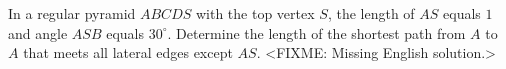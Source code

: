 \problem
In a regular pyramid $ABCDS$ with the top vertex $S$, the length of $AS$ equals
$1$ and angle $ASB$ equals $30^\circ$.
Determine the length of the shortest path from $A$ to $A$ that meets all
lateral edges except $AS$. 
\solution
<FIXME: Missing English solution.>
\endproblem
